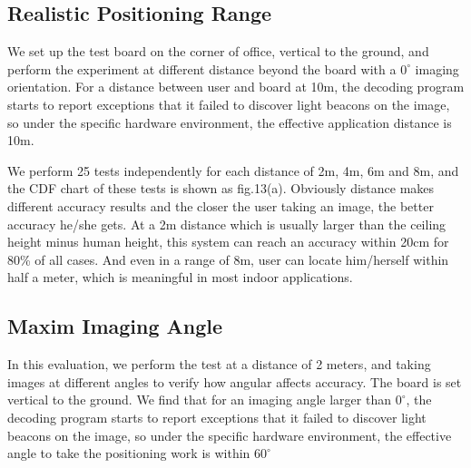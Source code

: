 \documentclass[conference]{IEEEtran}
\begin{document}
\subsection{\textbf{Realistic Positioning Range}}
We set up the test board on the corner of office, vertical to the ground, and perform the experiment at different distance beyond the board with a $0^{\circ}$ imaging orientation. For a distance between user and board at 10m, the decoding program starts to report exceptions that it failed to discover light beacons on the image, so under the specific hardware environment, the effective application distance is 10m.

We perform 25 tests independently for each distance of 2m, 4m, 6m and 8m, and the CDF chart of these tests is shown as fig.13(a). Obviously distance makes different accuracy results and the closer the user taking an image, the better accuracy he/she gets. At a 2m distance which is usually larger than the ceiling height minus human height, this system can reach an accuracy within 20cm for 80\% of all cases. And even in a range of 8m, user can locate him/herself within half a meter, which is meaningful in most indoor applications. 

\begin{figure}
	\footnotesize
\end{figure}

\subsection{\textbf{Maxim Imaging Angle}}
In this evaluation, we perform the test at a distance of 2 meters, and taking images at different angles to verify how angular affects accuracy. The board is set vertical to the ground. We find that for an imaging angle larger than $0^{\circ}$, the decoding program starts to report exceptions that it failed to discover light beacons on the image, so under the specific hardware environment, the effective angle to take the positioning work is within $60^{\circ}$
\end{document}
